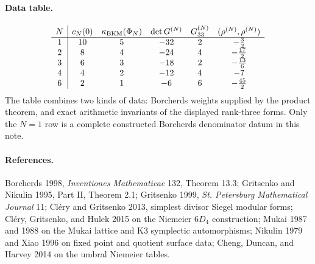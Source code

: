 \paragraph{Data table.}
\[
\begin{array}{c|ccccc}
N & c_N(0) & \kappa_{\mathrm{BKM}}(\Phi_N) & \det G^{(N)} & G^{(N)}_{33}
  & (\rho^{(N)},\rho^{(N)})\\
\hline
1 & 10 & 5 & -32 & 2 & -\tfrac32\\
2 & 8  & 4 & -24 & 4 & -\tfrac{17}{2}\\
3 & 6  & 3 & -18 & 2 & -\tfrac{13}{6}\\
4 & 4  & 2 & -12 & 4 & -7\\
6 & 2  & 1 & -6  & 6 & -\tfrac{45}{2}
\end{array}
\]
The table combines two kinds of data: Borcherds weights supplied by
the product theorem, and exact arithmetic invariants of the displayed
rank-three forms. Only the $N=1$ row is a complete constructed
Borcherds denominator datum in this note.

\paragraph{References.}
Borcherds 1998, \emph{Inventiones Mathematicae} 132, Theorem 13.3;
Gritsenko and Nikulin 1995, Part II, Theorem 2.1; Gritsenko 1999,
\emph{St. Petersburg Mathematical Journal} 11; Cl\'ery and Gritsenko
2013, simplest divisor Siegel modular forms; Cl\'ery, Gritsenko, and
Hulek 2015 on the Niemeier $6D_4$ construction; Mukai 1987 and 1988 on
the Mukai lattice and K3 symplectic automorphisms; Nikulin 1979 and
Xiao 1996 on fixed point and quotient surface data; Cheng, Duncan, and
Harvey 2014 on the umbral Niemeier tables.
